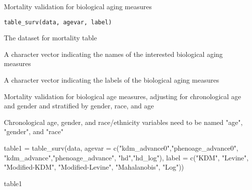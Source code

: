 \documentclass[a4paper]{book}
\begin{document}
\begin{Description}\relax
Mortality validation for biological aging measures
\end{Description}
%
\begin{Usage}
\begin{verbatim}
table_surv(data, agevar, label)
\end{verbatim}
\end{Usage}
%
\begin{Arguments}
\begin{ldescription}
\item[\code{data}] The dataset for mortality table

\item[\code{agevar}] A character vector indicating the names of the interested biological aging measures

\item[\code{label}] A character vector indicating the labels of the biological aging measures
\end{ldescription}
\end{Arguments}
%
\begin{Details}\relax
Mortality validation for biological age measures, adjusting for chronological age and gender and stratified by gender, race, and age
\end{Details}
%
\begin{Note}\relax
Chronological age, gender, and race/ethnicity variables need to be named "age", "gender", and "race"
\end{Note}
%
\begin{Examples}
\begin{ExampleCode}
table1 = table_surv(data,
                    agevar = c("kdm_advance0","phenoage_advance0",
                               "kdm_advance","phenoage_advance",
                               "hd","hd_log"),
                    label = c("KDM\nBiological\nAge",
                              "Levine\nPhenotypic\nAge",
                              "Modified-KDM\nBiological\nAge",
                              "Modified-Levine\nPhenotypic\nAge",
                              "Mahalanobis\nDistance",
                              "Log\nMahalanobis\nDistance"))

table1

\end{ExampleCode}
\end{Examples}
\printindex{}
\end{document}
